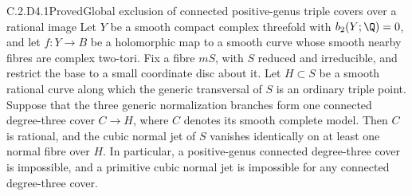 \begin{statement}{C.2.D4.1}{Proved}{Global exclusion of connected positive-genus triple covers over a rational image}
Let $Y$ be a smooth compact complex threefold with
$b_2(Y;\Q)=0$, and let $f:Y\to B$ be a holomorphic map to a
smooth curve whose smooth nearby fibres are complex two-tori.
Fix a fibre $mS$, with $S$ reduced and irreducible, and restrict
the base to a small coordinate disc about it. Let
$H\subset S$ be a smooth rational curve along which the generic
transversal of $S$ is an ordinary triple point. Suppose that the
three generic normalization branches form one connected degree-three
cover $C\to H$, where $C$ denotes its smooth complete model.
Then $C$ is rational, and the cubic normal jet of $S$ vanishes
identically on at least one normal fibre over $H$.
In particular, a positive-genus connected degree-three cover is
impossible, and a primitive cubic normal jet is impossible for
any connected degree-three cover.
\end{statement}
